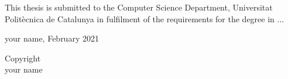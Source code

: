 \begin{dedication}



This thesis is submitted to the Computer Science Department, Universitat Polit\`ecnica de Catalunya in fulfilment of the requirements  for the degree in  ... 




\begin{center}
    

your name, February 2021 
\end{center}

\begin{center}
    

\vspace*{\fill}%

Copyright \textcopyright {} \\
your name


\end{center}







\end{dedication}



